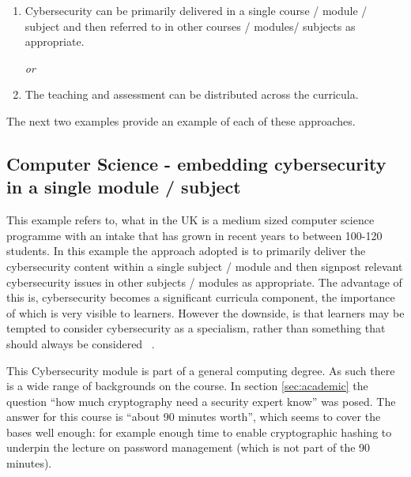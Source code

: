 \documentclass[conference]{IEEEtran}
\begin{document}
\begin{enumerate}
	\item Cybersecurity can be primarily delivered in a single course / module / subject and then referred to in other courses / modules/ subjects as appropriate.
	
	{\emph{or}}
	
	\item  The teaching  and assessment can be distributed across the curricula.  
\end{enumerate}
The next two examples provide an example of each of these approaches.
  
\subsection{Computer Science - embedding cybersecurity in a single module / subject }\label{sec:second} %
This example refers to, what in the UK is a medium sized computer science programme with an intake that has grown in recent years to between 100-120 students. In this example the approach adopted is to primarily deliver the cybersecurity content within a single subject / module and then signpost relevant  cybersecurity issues in other subjects / modules as appropriate. The advantage of this is, cybersecurity becomes a significant curricula component, the importance of which is very visible to learners. However the downside, is that learners may be tempted to consider cybersecurity as a specialism, rather than something that should always be considered~ \cite{Naiakshinaetal2017a}.

This Cybersecurity module is part of a general computing degree. As such there is a wide range of backgrounds on the course. In section \ref{sec:academic} the question ``how much cryptography need a security expert know'' was posed. The answer for this course is ``about 90 minutes worth'', which seems to cover the bases well enough: for example enough time to enable  cryptographic hashing to underpin the lecture on password management (which is not part of the 90 minutes).
\end{document}
